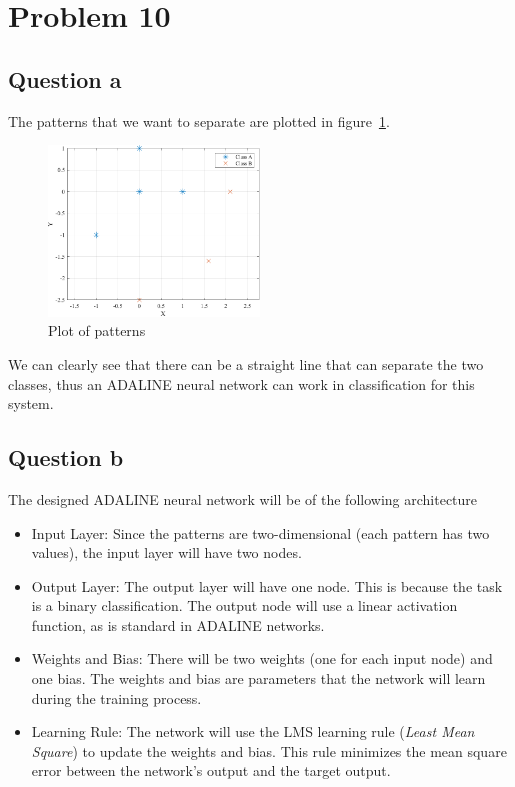 \section{Problem 10}

\subsection{Question a}

The patterns that we want to separate are plotted in figure~\ref{fig:prob_10_patterns}.

\begin{figure}[h]
	\centering
	\includegraphics[width=0.5\textwidth]{../Problem 10/patterns.pdf}
	\caption{Plot of patterns}
	\label{fig:prob_10_patterns}
\end{figure}

We can clearly see that there can be a straight line that can separate the two classes, thus an ADALINE neural network can work in classification for this system.

\subsection{Question b}

The designed ADALINE neural network will be of the following architecture
\begin{itemize}
	\item Input Layer: Since the patterns are two-dimensional (each pattern has two values), the input layer will have two nodes.
	\item Output Layer: The output layer will have one node. This is because the task is a binary classification. The output node will use a linear activation function, as is standard in ADALINE networks.
	\item Weights and Bias: There will be two weights (one for each input node) and one bias. The weights and bias are parameters that the network will learn during the training process.
	\item Learning Rule: The network will use the LMS learning rule (\textit{Least Mean Square}) to update the weights and bias. This rule minimizes the mean square error between the network's output and the target output.
\end{itemize}

